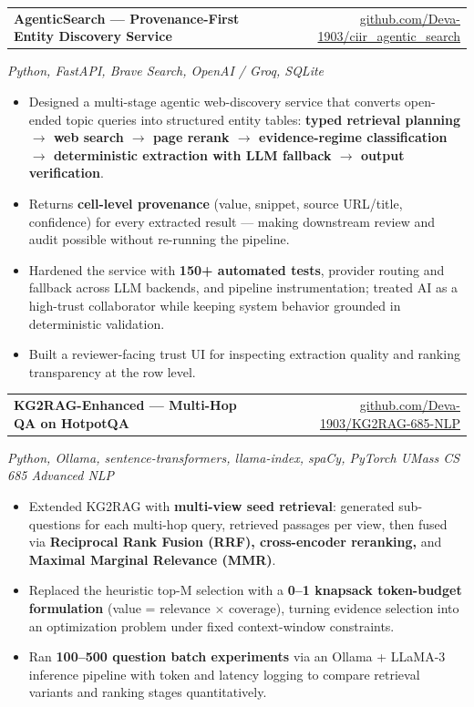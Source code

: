 \documentclass[letterpaper,10pt]{article}
\makeatletter
\newcommand{\portfolioItem}[1]{\item\small{#1\vspace{-1pt}}}
\newcommand{\projectHeading}[2]{
    \item
    \begin{tabular*}{0.985\textwidth}[t]{l@{\extracolsep{\fill}}r}
      \small\textbf{#1} & \small #2 \\
    \end{tabular*}\vspace{-5pt}
}
\newcommand{\projectSubheading}[1]{
  \vspace{-2pt}\item[] {\small\textcolor{ResumeSlate}{\emph{#1}}}\vspace{-3pt}
}
\newcommand{\bulletStart}{\begin{itemize}[leftmargin=0.18in, itemsep=2pt, topsep=1pt]}
\newcommand{\bulletEnd}{\end{itemize}\vspace{-4pt}}
\makeatother
\begin{document}
  \projectHeading
    {AgenticSearch --- Provenance-First Entity Discovery Service}
    {\href{https://github.com/Deva-1903/ciir_agentic_search}{github.com/Deva-1903/ciir\_agentic\_search}}
  \projectSubheading{Python, FastAPI, Brave Search, OpenAI / Groq, SQLite}
    \bulletStart
      \portfolioItem{Designed a multi-stage agentic web-discovery service that converts open-ended topic queries into structured entity tables: \textbf{typed retrieval planning $\rightarrow$ web search $\rightarrow$ page rerank $\rightarrow$ evidence-regime classification $\rightarrow$ deterministic extraction with LLM fallback $\rightarrow$ output verification}.}
      \portfolioItem{Returns \textbf{cell-level provenance} (value, snippet, source URL/title, confidence) for every extracted result --- making downstream review and audit possible without re-running the pipeline.}
      \portfolioItem{Hardened the service with \textbf{150+ automated tests}, provider routing and fallback across LLM backends, and pipeline instrumentation; treated AI as a high-trust collaborator while keeping system behavior grounded in deterministic validation.}
      \portfolioItem{Built a reviewer-facing trust UI for inspecting extraction quality and ranking transparency at the row level.}
    \bulletEnd

  \projectHeading
    {KG2RAG-Enhanced --- Multi-Hop QA on HotpotQA}
    {\href{https://github.com/Deva-1903/KG2RAG-685-NLP}{github.com/Deva-1903/KG2RAG-685-NLP}}
  \projectSubheading{Python, Ollama, sentence-transformers, llama-index, spaCy, PyTorch \enspace\textbar\enspace UMass CS 685 Advanced NLP}
    \bulletStart
      \portfolioItem{Extended KG2RAG with \textbf{multi-view seed retrieval}: generated sub-questions for each multi-hop query, retrieved passages per view, then fused via \textbf{Reciprocal Rank Fusion (RRF), cross-encoder reranking,} and \textbf{Maximal Marginal Relevance (MMR)}.}
      \portfolioItem{Replaced the heuristic top-M selection with a \textbf{0--1 knapsack token-budget formulation} (value = relevance $\times$ coverage), turning evidence selection into an optimization problem under fixed context-window constraints.}
      \portfolioItem{Ran \textbf{100--500 question batch experiments} via an Ollama + LLaMA-3 inference pipeline with token and latency logging to compare retrieval variants and ranking stages quantitatively.}
    \bulletEnd
\end{document}
